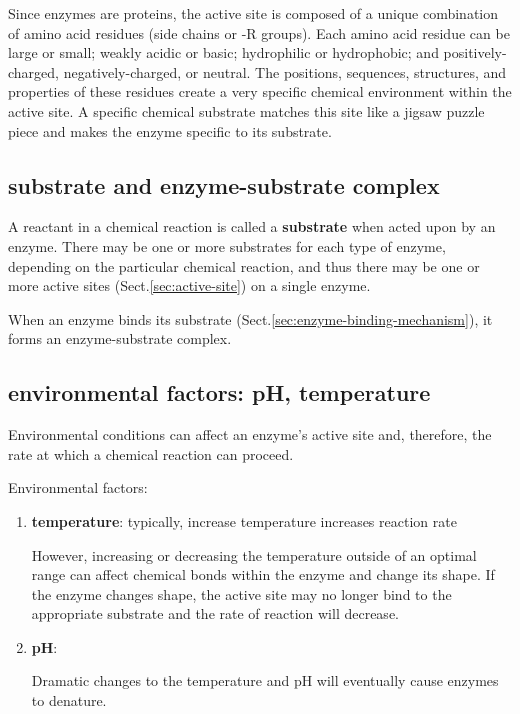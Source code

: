 Since enzymes are proteins, the active site is composed of a unique combination
of amino acid residues (side chains or -R groups).
Each amino acid residue can be large or small; weakly acidic or basic;
hydrophilic or hydrophobic; and positively-charged, negatively-charged, or
neutral. The positions, sequences, structures, and properties of these residues
create a very specific chemical environment within the active site. A specific
chemical substrate matches this site like a jigsaw puzzle piece and makes the
enzyme specific to its substrate.

\subsection{substrate and enzyme-substrate complex}
\label{sec:substrate}

A reactant in a chemical reaction is called a {\bf substrate} when acted upon by
an enzyme.  There may be one or more substrates for each type of enzyme,
depending on the particular chemical reaction, and thus there may be one or more
active sites (Sect.\ref{sec:active-site}) on a single enzyme.


When an enzyme binds its substrate (Sect.\ref{sec:enzyme-binding-mechanism}), it
forms an enzyme-substrate complex.


\subsection{environmental factors: pH, temperature}

Environmental conditions can affect an enzyme's active site and, therefore, the
rate at which a chemical reaction can proceed. 

Environmental factors:
\begin{enumerate}
  \item {\bf temperature}: typically, increase temperature increases reaction
  rate
  
However, increasing or decreasing the temperature outside of an optimal range
can affect chemical bonds within the enzyme and change its shape. If the enzyme
changes shape, the active site may no longer bind to the appropriate substrate
and the rate of reaction will decrease. 

  \item {\bf pH}: 
  
Dramatic changes to the temperature and
pH will eventually cause enzymes to denature.

  
\end{enumerate}

